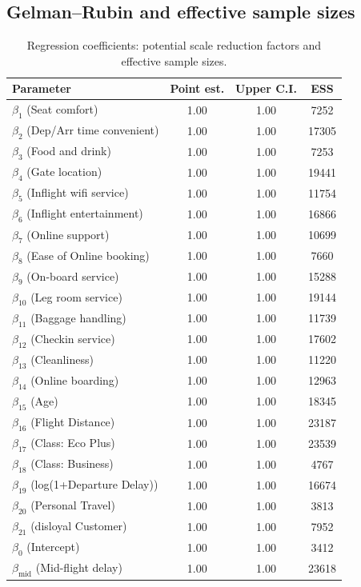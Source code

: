 \subsection*{Gelman--Rubin and effective sample sizes}
\begin{table}[htbp]
\centering\small
\caption{Regression coefficients: potential scale reduction factors and effective sample sizes.}
\label{tab:hs-psrf-beta}
\begin{tabular}{l S[table-format=1.2] S[table-format=1.2] S[table-format=5.0]}
\toprule
Parameter & {Point est.} & {Upper C.I.} & {ESS} \\
\midrule
$\beta_{1}$ (Seat comfort) & 1.00 & 1.00 & 7252 \\
$\beta_{2}$ (Dep/Arr time convenient) & 1.00 & 1.00 & 17305 \\
$\beta_{3}$ (Food and drink) & 1.00 & 1.00 & 7253 \\
$\beta_{4}$ (Gate location) & 1.00 & 1.00 & 19441 \\
$\beta_{5}$ (Inflight wifi service) & 1.00 & 1.00 & 11754 \\
$\beta_{6}$ (Inflight entertainment) & 1.00 & 1.00 & 16866 \\
$\beta_{7}$ (Online support) & 1.00 & 1.00 & 10699 \\
$\beta_{8}$ (Ease of Online booking) & 1.00 & 1.00 & 7660 \\
$\beta_{9}$ (On-board service) & 1.00 & 1.00 & 15288 \\
$\beta_{10}$ (Leg room service) & 1.00 & 1.00 & 19144 \\
$\beta_{11}$ (Baggage handling) & 1.00 & 1.00 & 11739 \\
$\beta_{12}$ (Checkin service) & 1.00 & 1.00 & 17602 \\
$\beta_{13}$ (Cleanliness) & 1.00 & 1.00 & 11220 \\
$\beta_{14}$ (Online boarding) & 1.00 & 1.00 & 12963 \\
$\beta_{15}$ (Age) & 1.00 & 1.00 & 18345 \\
$\beta_{16}$ (Flight Distance) & 1.00 & 1.00 & 23187 \\
$\beta_{17}$ (Class: Eco Plus) & 1.00 & 1.00 & 23539 \\
$\beta_{18}$ (Class: Business) & 1.00 & 1.00 & 4767 \\
$\beta_{19}$ (log(1+Departure Delay)) & 1.00 & 1.00 & 16674 \\
$\beta_{20}$ (Personal Travel) & 1.00 & 1.00 & 3813 \\
$\beta_{21}$ (disloyal Customer) & 1.00 & 1.00 & 7952 \\
$\beta_0$ (Intercept) & 1.00 & 1.00 & 3412 \\
$\beta_{\text{mid}}$ (Mid-flight delay) & 1.00 & 1.00 & 23618 \\
\bottomrule
\end{tabular}
\end{table}

